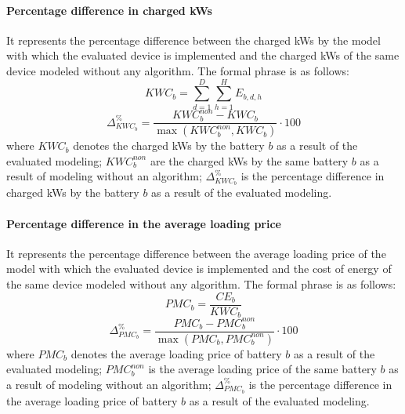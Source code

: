 \paragraph{Percentage difference in charged kWs}
It represents the percentage difference between the charged kWs by the model with which the evaluated device is implemented and the charged kWs of the same device modeled without any algorithm. The formal phrase is as follows:
\begin{equation}
    KWC_b = \sum^{D}_{d = 1}\sum^{H}_{h = 1} E_{b, d,h}
\end{equation}
\begin{equation}
    \Delta ^\%_{KWC_b} = \frac{KWC^{non}_b - KWC_b}{\max(KWC^{non}_b, KWC_b)} \cdot 100
\end{equation}
where $KWC_b$ denotes the charged kWs by the battery $b$ as a result of the evaluated modeling; $KWC^{non}_b$ are the charged kWs by the same battery $b$ as a result of modeling without an algorithm; $\Delta ^\%_{KWC_b}$ is the percentage difference in charged kWs by the battery $b$ as a result of the evaluated modeling.
    
\paragraph{Percentage difference in the average loading price}
It represents the percentage difference between the average loading price of the model with which the evaluated device is implemented and the cost of energy of the same device modeled without any algorithm. The formal phrase is as follows:
\begin{equation}
    PMC_b = \frac{CE_b}{KWC_b}
\end{equation}
\begin{equation}
    \Delta ^\%_{PMC_b} = \frac{PMC_b - PMC^{non}_b}{\max(PMC_b, PMC^{non}_b)} \cdot 100
\end{equation}
where $PMC_b$ denotes the average loading price of battery $b$ as a result of the evaluated modeling; $PMC^{non}_b$ is the average loading price of the same battery $b$ as a result of modeling without an algorithm; $\Delta ^\%_{PMC_b}$ is the percentage difference in the average loading price of battery $b$ as a result of the evaluated modeling.

